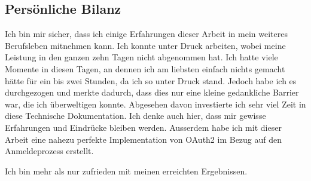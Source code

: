 \subsection{Persönliche Bilanz}
Ich bin mir sicher, dass ich einige Erfahrungen dieser Arbeit in mein weiteres Berufsleben mitnehmen kann. Ich konnte unter Druck arbeiten, wobei meine Leistung in den ganzen zehn Tagen nicht abgenommen hat. Ich hatte viele Momente in diesen Tagen, an dennen ich am liebsten einfach nichts gemacht hätte für ein bis zwei Stunden, da ich so unter Druck stand. Jedoch habe ich es durchgezogen und merkte dadurch, dass dies nur eine kleine gedankliche Barrier war, die ich überweltigen konnte.
Abgesehen davon investierte ich sehr viel Zeit in diese Technische Dokumentation. Ich denke auch hier, dass mir gewisse Erfahrungen und Eindrücke bleiben werden.
Ausserdem habe ich mit dieser Arbeit eine nahezu perfekte Implementation von OAuth2 im Bezug auf den Anmeldeprozess erstellt.

Ich bin mehr als nur zufrieden mit meinen erreichten Ergebnissen.